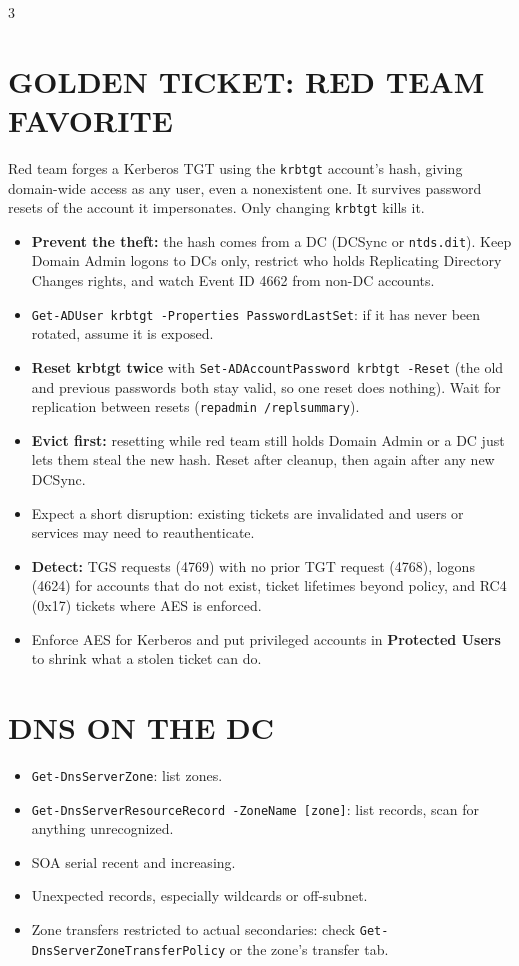 \documentclass[7pt,landscape]{article}
\begin{document}
\begin{multicols*}{3}
\section{GOLDEN TICKET: RED TEAM FAVORITE}
Red team forges a Kerberos TGT using the \texttt{krbtgt} account's hash, giving domain-wide access as any user, even a nonexistent one. It survives password resets of the account it impersonates. Only changing \texttt{krbtgt} kills it.
\begin{itemize}
    \item \textbf{Prevent the theft:} the hash comes from a DC (DCSync or \texttt{ntds.dit}). Keep Domain Admin logons to DCs only, restrict who holds Replicating Directory Changes rights, and watch Event ID 4662 from non-DC accounts.
    \item \texttt{Get-ADUser krbtgt -Properties PasswordLastSet}: if it has never been rotated, assume it is exposed.
    \item \textbf{Reset krbtgt twice} with \texttt{Set-ADAccountPassword krbtgt -Reset} (the old and previous passwords both stay valid, so one reset does nothing). Wait for replication between resets (\texttt{repadmin /replsummary}).
    \item \textbf{Evict first:} resetting while red team still holds Domain Admin or a DC just lets them steal the new hash. Reset after cleanup, then again after any new DCSync.
    \item Expect a short disruption: existing tickets are invalidated and users or services may need to reauthenticate.
    \item \textbf{Detect:} TGS requests (4769) with no prior TGT request (4768), logons (4624) for accounts that do not exist, ticket lifetimes beyond policy, and RC4 (0x17) tickets where AES is enforced.
    \item Enforce AES for Kerberos and put privileged accounts in \textbf{Protected Users} to shrink what a stolen ticket can do.
\end{itemize}

\section{DNS ON THE DC}
\begin{itemize}
    \item \texttt{Get-DnsServerZone}: list zones.
    \item \texttt{Get-DnsServerResourceRecord -ZoneName [zone]}: list records, scan for anything unrecognized.
    \item SOA serial recent and increasing.
    \item Unexpected records, especially wildcards or off-subnet.
    \item Zone transfers restricted to actual secondaries: check \texttt{Get-DnsServerZoneTransferPolicy} or the zone's transfer tab.
\end{itemize}


\end{multicols*}
\end{document}
